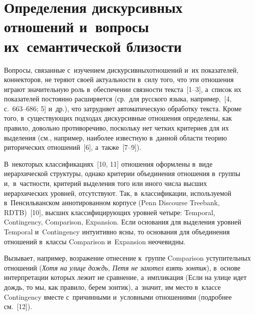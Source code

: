 
  



\thispagestyle{headings}

\begin{multicols}{2}

\label{st\stat}

\section{Определения дискурсивных отношений и~вопросы их~семантической близости}


  Вопросы, связанные с~изучением дискурсивных\linebreak отношений и~их показателей, 
коннекторов, не те\-ря\-ют своей ак\-ту\-аль\-ности в~силу того, что эти от\-но\-ше\-ния 
играют значительную роль в~обеспечении связ\-ности текс\-та~[1--3], а~список их 
показателей постоянно расширяется (ср.\ для русского языка, например,~[4, 
с.~663--686; 5] и~др.), что за\-труд\-ня\-ет автоматическую обработку текс\-та. Кроме 
того, в~су\-щест\-ву\-ющих подходах дискурсивные отношения определены, как 
правило, довольно противоречиво, по\-сколь\-ку нет чет\-ких критериев для их 
выделения (см., например, наиболее известную в~данной об\-ласти тео\-рию 
риторических отношений~[6], а~так\-же~[7--9]). 

В~некоторых 
классификациях~[10, 11] отношения оформлены в~виде иерархической 
структуры, однако критерии объ\-еди\-не\-ния отношения в~группы и,~в~част\-ности, 
критерий выделения того или иного чис\-ла выс\-ших иерархических уров\-ней, 
отсутствуют. Так, в~классификации, ис\-поль\-зу\-емой в~Пенсильванском 
аннотированном корпусе (Penn Discourse Treebank, RDTB)~[10], выс\-ших клас\-си\-фи\-ци\-ру\-ющих уров\-ней четыре: 
Temporal, Contingency, Comparison, Expansion. Если основания для выделения 
уров\-ней Temporal и~Contingency интуитивно ясны, то основания для 
объединения отношений в~классы Comparison и~Expansion не\-оче\-вид\-ны. 

Вызывает, например, воз\-ра\-же\-ние отнесение к~группе Comparison 
уступительных отношений (\textit{Хотя на улице дождь, Петя не захотел 
взять зонтик}), в~основе интерпретации которых лежит не сравнение, 
а~импликация (Если на улице идет дождь, то мы, как правило, берем зонтик), 
а~значит, им мес\-то в~классе Contingency вмес\-те с~причинными и~условными 
отношениями (подробнее см.~[12]). 


\end{multicols}
